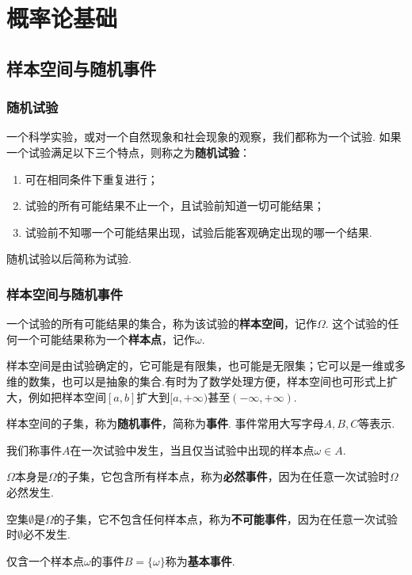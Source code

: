 \chapter{概率论基础}
\section{样本空间与随机事件}
\subsection{随机试验}
\begin{definition}
一个科学实验，或对一个自然现象和社会现象的观察，我们都称为一个试验.
如果一个试验满足以下三个特点，则称之为\textbf{随机试验}：
\begin{enumerate}
\item 可在相同条件下重复进行；
\item 试验的所有可能结果不止一个，且试验前知道一切可能结果；
\item 试验前不知哪一个可能结果出现，试验后能客观确定出现的哪一个结果.
\end{enumerate}
随机试验以后简称为试验.
\end{definition}

\subsection{样本空间与随机事件}
\begin{definition}
一个试验的所有可能结果的集合，称为该试验的\textbf{样本空间}，记作\(\Omega\).
这个试验的任何一个可能结果称为一个\textbf{样本点}，记作\(\omega\).
\end{definition}

样本空间是由试验确定的，它可能是有限集，也可能是无限集；它可以是一维或多维的数集，也可以是抽象的集合.有时为了数学处理方便，样本空间也可形式上扩大，例如把样本空间\([a,b]\)扩大到\([a,+\infty)\)甚至\((-\infty,+\infty)\).

\begin{definition}
样本空间的子集，称为\textbf{随机事件}，简称为\textbf{事件}.
事件常用大写字母\(A,B,C\)等表示.

我们称事件\(A\)在一次试验中发生，当且仅当试验中出现的样本点\(\omega \in A\).
\end{definition}

\begin{definition}
\(\Omega\)本身是\(\Omega\)的子集，它包含所有样本点，称为\textbf{必然事件}，因为在任意一次试验时\(\Omega\)必然发生.

空集\(\emptyset\)是\(\Omega\)的子集，它不包含任何样本点，称为\textbf{不可能事件}，因为在任意一次试验时\(\emptyset\)必不发生.

仅含一个样本点\(\omega\)的事件\(B = \{ \omega \}\)称为\textbf{基本事件}.
\end{definition}

